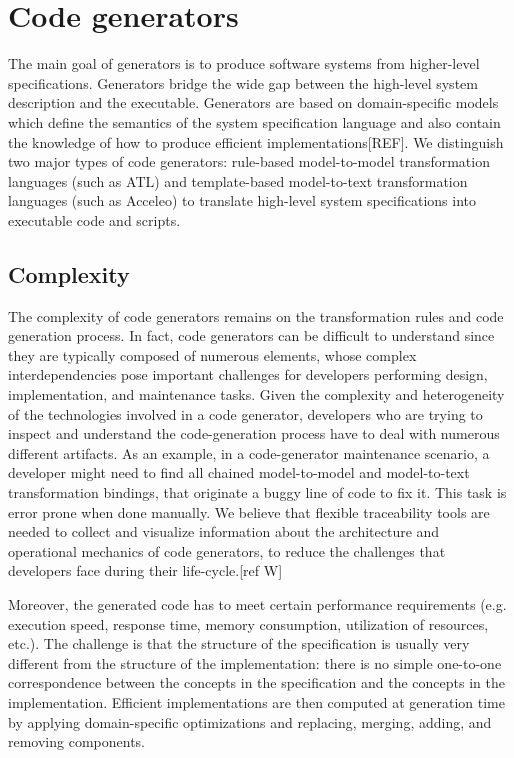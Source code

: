\section{Code generators}
The main goal of generators is to produce software systems from higher-level specifications. Generators bridge the wide gap between the high-level system description and the executable. Generators are based on domain-specific models which define the semantics of the system specification language and also contain the knowledge of how to produce efficient implementations[REF]. 
We distinguish two major types of code generators: rule-based model-to-model transformation languages (such as ATL) and template-based model-to-text transformation languages (such as Acceleo) to translate high-level system specifications into executable code and scripts.
\subsection{Complexity}
The complexity of code generators remains on the transformation rules and code generation process. In fact, code generators can be difficult to understand since they are typically composed of numerous elements, whose complex interdependencies pose important challenges for developers performing design, implementation, and maintenance tasks. 
Given the complexity and heterogeneity of the technologies involved in a code generator, developers who are trying to inspect and understand the code-generation process have to deal with numerous different artifacts. As an example, in a code-generator maintenance scenario, a developer might need to find all chained model-to-model and model-to-text transformation bindings, that originate a buggy line of code to fix it. This task is error prone when done manually. We believe that flexible traceability tools are needed to collect and visualize information about the architecture and operational mechanics of code generators, to reduce the challenges that developers face during their life-cycle.[ref W]

Moreover, the generated code has to meet certain performance requirements (e.g. execution speed, response time, memory consumption, utilization of resources, etc.). The challenge is that the structure of the specification is usually very different from the structure of the implementation: there is no simple one-to-one correspondence between the concepts in the specification and the concepts in the implementation. 
Efficient implementations are then computed at generation time by applying domain-specific optimizations and replacing, merging, adding, and removing components.

